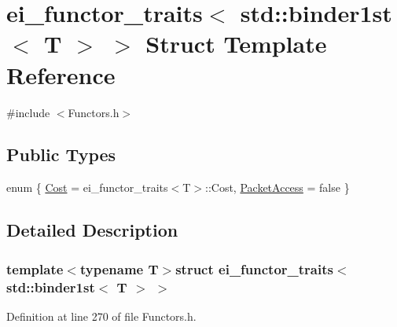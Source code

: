 \hypertarget{structei__functor__traits_3_01std_1_1binder1st_3_01_t_01_4_01_4}{\section{ei\-\_\-functor\-\_\-traits$<$ std\-:\-:binder1st$<$ T $>$ $>$ Struct Template Reference}
\label{structei__functor__traits_3_01std_1_1binder1st_3_01_t_01_4_01_4}
}


{\ttfamily \#include $<$Functors.\-h$>$}

\subsection*{Public Types}
\begin{DoxyCompactItemize}
\item 
enum \{ \hyperlink{structei__functor__traits_3_01std_1_1binder1st_3_01_t_01_4_01_4_af25e50d08b8e80b1ecec85487e1913d8a33e88dd6f8fc5421a72a9d394998684d}{Cost} = ei\-\_\-functor\-\_\-traits$<$T$>$\-:\-:Cost, 
\hyperlink{structei__functor__traits_3_01std_1_1binder1st_3_01_t_01_4_01_4_af25e50d08b8e80b1ecec85487e1913d8a88376aeea60cbee5271ea86499e300f2}{Packet\-Access} = false
 \}
\end{DoxyCompactItemize}


\subsection{Detailed Description}
\subsubsection*{template$<$typename T$>$struct ei\-\_\-functor\-\_\-traits$<$ std\-::binder1st$<$ T $>$ $>$}



Definition at line 270 of file Functors.\-h.



